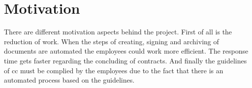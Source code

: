  \section{Motivation}
 There are different motivation aspects behind the project. First of all is the reduction of work. When the steps of creating, signing and archiving of documents are automated the employees could work more efficient. The response time gets faster regarding the concluding of contracts. And finally the guidelines of \gls{cc} must be complied by the employees due to the fact that there is an automated process based on the guidelines. 